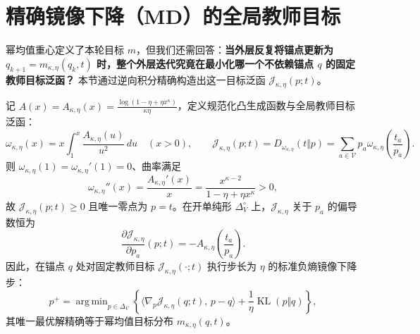 \documentclass[lang=cn,scheme=chinese,openany]{elegantbook}
\newcommand{\KL}{\operatorname{KL}}
\DeclareMathOperator*{\argmin}{arg\,min}
\begin{document}
\section{精确镜像下降（MD）的全局教师目标}
\label{sec:proximal-md-objective}

幂均值重心定义了本轮目标 $m$，但我们还需回答：\textbf{当外层反复将锚点更新为 $q_{k+1}=m_{\kappa,\eta}(q_k,t)$ 时，整个外层迭代究竟在最小化哪一个不依赖锚点 $q$ 的固定教师目标泛函？} 本节通过逆向积分精确构造出这一目标泛函 $\mathcal J_{\kappa,\eta}(p;t)$。

\begin{theorem}
\label{thm:power-md-integrable-objective}
记 $A(x)=A_{\kappa,\eta}(x)=\frac{\log(1-\eta+\eta x^\kappa)}{\kappa\eta}$，定义规范化凸生成函数与全局教师目标泛函：
\begin{equation}
 \omega_{\kappa,\eta}(x)
 =x\int_1^x\frac{A_{\kappa,\eta}(u)}{u^2}\,du
 \quad (x>0),
 \qquad
 \mathcal J_{\kappa,\eta}(p;t)
 =D_{\omega_{\kappa,\eta}}(t\Vert p)
 =\sum_{a\in\mathcal V} p_a\omega_{\kappa,\eta}\!\left(\frac{t_a}{p_a}\right).
 \label{eq:power-md-generator-integral,eq:power-md-fixed-objective}
\end{equation}
则 $\omega_{\kappa,\eta}(1)=\omega_{\kappa,\eta}'(1)=0$、曲率满足
\begin{equation}
 \omega_{\kappa,\eta}''(x)=\frac{A_{\kappa,\eta}'(x)}{x}
 =\frac{x^{\kappa-2}}{1-\eta+\eta x^\kappa}>0,
 \label{eq:power-md-curvature}
\end{equation}
故 $\mathcal J_{\kappa,\eta}(p;t)\ge 0$ 且唯一零点为 $p=t$。在开单纯形 $\Delta_V^\circ$ 上，$\mathcal J_{\kappa,\eta}$ 关于 $p_a$ 的偏导数恒为
\begin{equation}
 \frac{\partial\mathcal J_{\kappa,\eta}}{\partial p_a}(p;t)
 =-A_{\kappa,\eta}\!\left(\frac{t_a}{p_a}\right).
 \label{eq:power-md-exact-gradient}
\end{equation}
因此，在锚点 $q$ 处对固定教师目标 $\mathcal J_{\kappa,\eta}(\cdot;t)$ 执行步长为 $\eta$ 的标准负熵镜像下降步：
\begin{equation}
 p^+=\argmin_{p\in\Delta_V}
 \left\{\bigl\langle\nabla_p\mathcal J_{\kappa,\eta}(q;t),\,p-q\bigr\rangle
       +\frac1\eta\KL(p\Vert q)\right\},
 \label{eq:power-md-exact-step}
\end{equation}
其唯一最优解精确等于幂均值目标分布 $m_{\kappa,\eta}(q,t)$。
\end{theorem}
\end{document}
